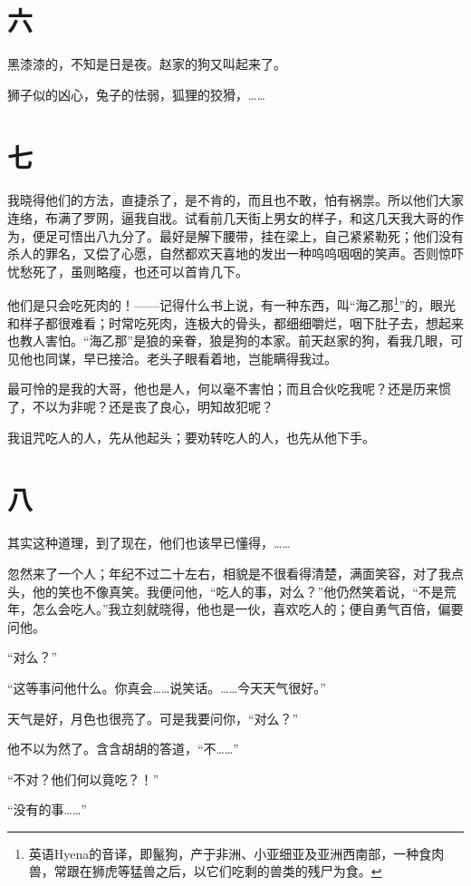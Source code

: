 \documentclass[12pt,UTF8]{ctexbook}
\begin{document}
\section{六}

黑漆漆的，不知是日是夜。赵家的狗又叫起来了。

狮子似的凶心，兔子的怯弱，狐狸的狡猾，……

\section{七}

我晓得他们的方法，直捷杀了，是不肯的，而且也不敢，怕有祸祟。所以他们大家连络，布满了罗网，逼我自戕。试看前几天街上男女的样子，和这几天我大哥的作为，便足可悟出八九分了。最好是解下腰带，挂在梁上，自己紧紧勒死；他们没有杀人的罪名，又偿了心愿，自然都欢天喜地的发出一种呜呜咽咽的笑声。否则惊吓忧愁死了，虽则略瘦，也还可以首肯几下。

他们是只会吃死肉的！——记得什么书上说，有一种东西，叫“海乙那\footnote{英语Hyena的音译，即鬣狗，产于非洲、小亚细亚及亚洲西南部，一种食肉兽，常跟在狮虎等猛兽之后，以它们吃剩的兽类的残尸为食。}”的，眼光和样子都很难看；时常吃死肉，连极大的骨头，都细细嚼烂，咽下肚子去，想起来也教人害怕。“海乙那”是狼的亲眷，狼是狗的本家。前天赵家的狗，看我几眼，可见他也同谋，早已接洽。老头子眼看着地，岂能瞒得我过。

最可怜的是我的大哥，他也是人，何以毫不害怕；而且合伙吃我呢？还是历来惯了，不以为非呢？还是丧了良心，明知故犯呢？

我诅咒吃人的人，先从他起头；要劝转吃人的人，也先从他下手。

\section{八}

其实这种道理，到了现在，他们也该早已懂得，……

忽然来了一个人；年纪不过二十左右，相貌是不很看得清楚，满面笑容，对了我点头，他的笑也不像真笑。我便问他，“吃人的事，对么？”他仍然笑着说，“不是荒年，怎么会吃人。”我立刻就晓得，他也是一伙，喜欢吃人的；便自勇气百倍，偏要问他。

“对么？”

“这等事问他什么。你真会……说笑话。……今天天气很好。”

天气是好，月色也很亮了。可是我要问你，“对么？”

他不以为然了。含含胡胡的答道，“不……”

“不对？他们何以竟吃？！”

“没有的事……”
\end{document}
